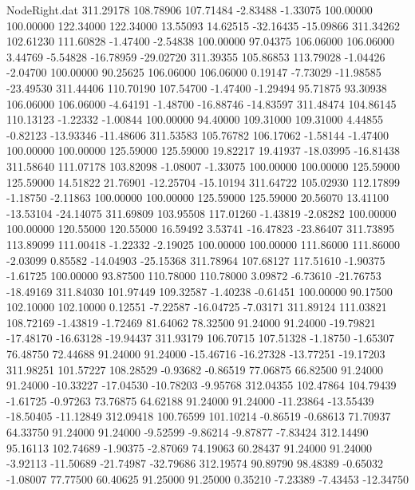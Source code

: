 \begin{filecontents}{NodeRight.dat}
 311.29178  108.78906  107.71484    -2.83488   -1.33075  100.00000  100.00000  122.34000  122.34000   13.55093   14.62515  -32.16435  -15.09866
 311.34262  102.61230  111.60828    -1.47400   -2.54838  100.00000   97.04375  106.06000  106.06000    3.44769   -5.54828  -16.78959  -29.02720
 311.39355  105.86853  113.79028    -1.04426   -2.04700  100.00000   90.25625  106.06000  106.06000    0.19147   -7.73029  -11.98585  -23.49530
 311.44406  110.70190  107.54700    -1.47400   -1.29494   95.71875   93.30938  106.06000  106.06000   -4.64191   -1.48700  -16.88746  -14.83597
 311.48474  104.86145  110.13123    -1.22332   -1.00844  100.00000   94.40000  109.31000  109.31000    4.44855   -0.82123  -13.93346  -11.48606
 311.53583  105.76782  106.17062    -1.58144   -1.47400  100.00000  100.00000  125.59000  125.59000   19.82217   19.41937  -18.03995  -16.81438
 311.58640  111.07178  103.82098    -1.08007   -1.33075  100.00000  100.00000  125.59000  125.59000   14.51822   21.76901  -12.25704  -15.10194
 311.64722  105.02930  112.17899    -1.18750   -2.11863  100.00000  100.00000  125.59000  125.59000   20.56070   13.41100  -13.53104  -24.14075
 311.69809  103.95508  117.01260    -1.43819   -2.08282  100.00000  100.00000  120.55000  120.55000   16.59492    3.53741  -16.47823  -23.86407
 311.73895  113.89099  111.00418    -1.22332   -2.19025  100.00000  100.00000  111.86000  111.86000   -2.03099    0.85582  -14.04903  -25.15368
 311.78964  107.68127  117.51610    -1.90375   -1.61725  100.00000   93.87500  110.78000  110.78000    3.09872   -6.73610  -21.76753  -18.49169
 311.84030  101.97449  109.32587    -1.40238   -0.61451  100.00000   90.17500  102.10000  102.10000    0.12551   -7.22587  -16.04725   -7.03171
 311.89124  111.03821  108.72169    -1.43819   -1.72469   81.64062   78.32500   91.24000   91.24000  -19.79821  -17.48170  -16.63128  -19.94437
 311.93179  106.70715  107.51328    -1.18750   -1.65307   76.48750   72.44688   91.24000   91.24000  -15.46716  -16.27328  -13.77251  -19.17203
 311.98251  101.57227  108.28529    -0.93682   -0.86519   77.06875   66.82500   91.24000   91.24000  -10.33227  -17.04530  -10.78203   -9.95768
 312.04355  102.47864  104.79439    -1.61725   -0.97263   73.76875   64.62188   91.24000   91.24000  -11.23864  -13.55439  -18.50405  -11.12849
 312.09418  100.76599  101.10214    -0.86519   -0.68613   71.70937   64.33750   91.24000   91.24000   -9.52599   -9.86214   -9.87877   -7.83424
 312.14490   95.16113  102.74689    -1.90375   -2.87069   74.19063   60.28437   91.24000   91.24000   -3.92113  -11.50689  -21.74987  -32.79686
 312.19574   90.89790   98.48389    -0.65032   -1.08007   77.77500   60.40625   91.25000   91.25000    0.35210   -7.23389   -7.43453  -12.34750

\end{filecontents}
